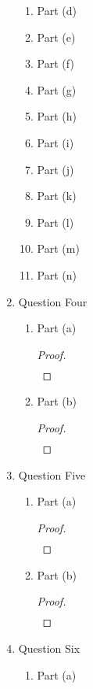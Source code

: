 \documentclass{article}
\begin{document}
\begin{enumerate}
\begin{enumerate}
        \item Part (d)
        \item Part (e)
        \item Part (f)
        \item Part (g)
        \item Part (h)
        \item Part (i)
        \item Part (j)
        \item Part (k)
        \item Part (l)
        \item Part (m)
        \item Part (n)
    \end{enumerate}
    \item Question Four
    \begin{enumerate}
        \item Part (a)
        \begin{proof}
            \begin{align}
                &
            \end{align}
        \end{proof}
        \item Part (b)
        \begin{proof}
            \begin{align}
                &
            \end{align}
        \end{proof}
    \end{enumerate}
    \item Question Five
    \begin{enumerate}
        \item Part (a)
        \begin{proof}
            \begin{align}
                &
            \end{align}
        \end{proof}
        \item Part (b)
        \begin{proof}
            \begin{align}
                &
            \end{align}
        \end{proof}
    \end{enumerate}
    \item Question Six
    \begin{enumerate}
        \item Part (a)

\end{enumerate}
\end{enumerate}
\end{document}
